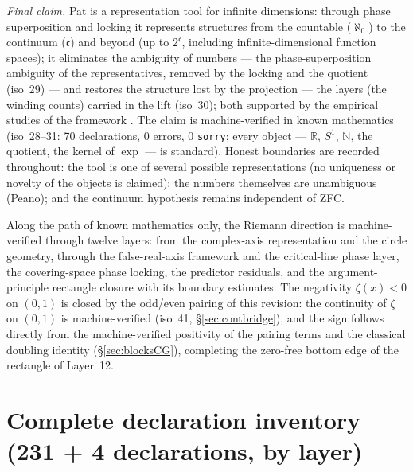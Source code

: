 \documentclass{article}
\newcommand{\zt}{\zeta}
\begin{document}
\emph{Final claim.} Pat is a representation tool for infinite
dimensions: through phase superposition and locking it represents
structures from the countable ($\aleph_0$) to the continuum
($\mathfrak c$) and beyond (up to $2^{\mathfrak c}$, including
infinite-dimensional function spaces); it eliminates the ambiguity of
numbers --- the phase-superposition ambiguity of the representatives,
removed by the locking and the quotient (iso~29) --- and restores the
structure lost by the projection --- the layers (the winding counts)
carried in the lift (iso~30); both supported by the empirical studies
of the framework \cite{patbase}. The claim is machine-verified
in known mathematics (iso~28--31: 70 declarations, 0 errors, 0
\texttt{sorry}; every object --- $\mathbb R$, $S^1$, $\mathbb N$, the
quotient, the kernel of $\exp$ --- is standard). Honest boundaries are
recorded throughout: the tool is one of several possible
representations (no uniqueness or novelty of the objects is claimed);
the numbers themselves are unambiguous (Peano); and the continuum
hypothesis remains independent of ZFC.

Along the path of known mathematics only, the Riemann direction is
machine-verified through twelve layers: from the complex-axis representation
and the circle geometry, through the false-real-axis framework and the
critical-line phase layer, the covering-space phase locking, the predictor
residuals, and the argument-principle rectangle closure with its boundary
estimates. The negativity $\zt(x)<0$ on $(0,1)$ is closed by the odd/even
pairing of this revision: the continuity of $\zt$ on $(0,1)$ is
machine-verified (iso~41, \S\ref{sec:contbridge}), and the sign follows
directly from the machine-verified positivity of the pairing terms and the
classical doubling identity (\S\ref{sec:blocksCG}), completing the
zero-free bottom edge of the rectangle of Layer~12.

\appendix
\section{Complete declaration inventory (231 + 4 declarations, by layer)}
\label{app:inventory}
\end{document}
